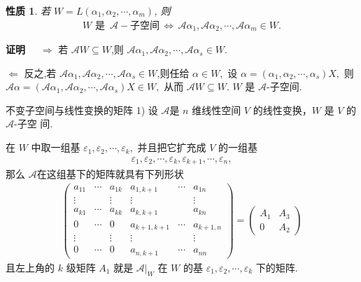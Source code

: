 \documentclass[13pt]{beamer}
\newtheorem*{prop}{性质}
\def\pf{{\bf 证明~~ }}
\def\A{\mathscr{A}}
\begin{document}
\begin{frame}
\begin{prop}
若  $W=L\left(\alpha_{1}, \alpha_{2}, \cdots, \alpha_{m}\right)$, 则 
\begin{align*}
W \mbox{ 是 }\, \A -\mbox{子空间} \, \Leftrightarrow \,  
\A  \alpha_{1}, \A  \alpha_{2}, \cdots, \A  \alpha_{m} \in W.
\end{align*}
\end{prop}

\pf  
$\Rightarrow$ 若 $\A  W \subseteq W$,则 $\A  \alpha_{1}, \A  \alpha_{2}, \cdots, \A  \alpha_{s} \in W$.

$\Leftarrow$ 反之,若 $\A  \alpha_{1}, \A  \alpha_{2}, \cdots, \A  \alpha_{s} \in W$,则任给
$\alpha \in W,$ 设 $\alpha=\left(\alpha_{1}, \alpha_{2}, \cdots, \alpha_{s}\right) X,$ 则 $\A  \alpha=\left(\A  \alpha_{1}, \A  \alpha_{2}, \cdots, \A  \alpha_{s}\right) X \in W,$ 从而 $\A  W \subseteq W$. 
$W$ 是 $\A$-子空间.
\end{frame}



\begin{frame}{不变子空间与线性变换的矩阵}
1) 设 $\A$是 $n$ 维线性空间 $V$ 的线性变换，$W$ 是 $V$ 的 $\A$-子空
间. 

在 $W$ 中取一组基 ${\varepsilon}_{1}, {\varepsilon}_{2}, \cdots, {\varepsilon}_{k},$ 并且把它扩充成 $V$ 的一组基
\begin{align}\label{eq-b}
{\varepsilon}_{1}, {\varepsilon}_{2}, \cdots, {\varepsilon}_{k}, {\varepsilon}_{k+1}, \cdots, {\varepsilon}_{n},
\end{align}
 那么 $\A$在这组基下的矩阵就具有下列形状
 \begin{align}\label{eq-utm}
\left(\begin{array}{cccccc}a_{11} & \cdots & a_{1 k} & a_{1, k+1} & \cdots & a_{1 n} \\ \vdots & & \vdots & \vdots & & \vdots \\ a_{k 1} & \cdots & a_{k k} & a_{k, k+1} & & a_{k n} \\ 0 & \cdots & 0 & a_{k+1, k+1} & \cdots & a_{k+1, n} \\ \vdots & & \vdots & \vdots & & \vdots \\ 0 & \cdots & 0 & a_{n, k+1} & \cdots & a_{n n}\end{array}\right)=\left(\begin{array}{cc}A_{1} & A_{3} \\ 0 & A_{2}\end{array}\right)
 \end{align}
且左上角的 $k$ 级矩阵 ${A}_{1}$ 就是 $\mathscr{A} |_W$ 在 $W$ 的基 ${\varepsilon}_{1}, {\varepsilon}_{2}, \cdots, {\varepsilon}_{k}$ 下的矩阵. 

\end{frame}
\end{document}
